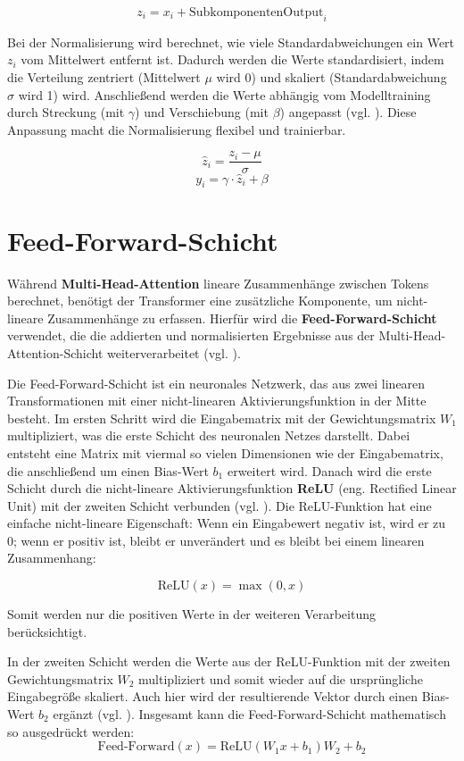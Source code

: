 \[
z_i = x_i + \text{SubkomponentenOutput}_i
\]

Bei der Normalisierung wird berechnet, wie viele Standardabweichungen ein Wert \( z_i \) vom Mittelwert entfernt ist. 
Dadurch werden die Werte standardisiert, indem die Verteilung zentriert (Mittelwert \( \mu \) wird 0) und skaliert (Standardabweichung \( \sigma \) wird 1) wird. 
Anschließend werden die Werte abhängig vom Modelltraining durch Streckung (mit \( \gamma \)) und Verschiebung (mit \( \beta \)) angepasst (vgl. \cite[K. 3]{layernorm}). 
Diese Anpassung macht die Normalisierung flexibel und trainierbar.

\[
\hat{z}_i = \frac{z_i - \mu}{\sigma}
\]
\[
y_i = \gamma \cdot \hat{z}_i + \beta
\]

\section{Feed-Forward-Schicht}

Während \textbf{Multi-Head-Attention} lineare Zusammenhänge zwischen Tokens berechnet, benötigt der Transformer eine zusätzliche Komponente, um nicht-lineare Zusammenhänge zu erfassen. 
Hierfür wird die \textbf{Feed-Forward-Schicht} verwendet, die die addierten und normalisierten Ergebnisse aus der Multi-Head-Attention-Schicht weiterverarbeitet (vgl. \cite[S. 5]{attention}).

Die Feed-Forward-Schicht ist ein neuronales Netzwerk, das aus zwei linearen Transformationen mit einer nicht-linearen Aktivierungsfunktion in der Mitte besteht.
Im ersten Schritt wird die Eingabematrix mit der Gewichtungsmatrix \( W_1 \) multipliziert, was die erste Schicht des neuronalen Netzes darstellt. Dabei entsteht eine Matrix mit viermal so vielen Dimensionen wie der Eingabematrix, die anschließend um einen Bias-Wert \( b_1 \) erweitert wird.
Danach wird die erste Schicht durch die nicht-lineare Aktivierungsfunktion \textbf{ReLU} (eng. Rectified Linear Unit) mit der zweiten Schicht verbunden (vgl. \cite[S. 212]{paass.2020}). 
Die ReLU-Funktion hat eine einfache nicht-lineare Eigenschaft: Wenn ein Eingabewert negativ ist, wird er zu 0; wenn er positiv ist, bleibt er unverändert und es bleibt bei einem linearen Zusammenhang:

\[
\text{ReLU}(x) = \max(0, x)
\]

Somit werden nur die positiven Werte in der weiteren Verarbeitung berücksichtigt.

In der zweiten Schicht werden die Werte aus der ReLU-Funktion mit der zweiten Gewichtungsmatrix \( W_2 \) multipliziert und somit wieder auf die ursprüngliche Eingabegröße skaliert. 
Auch hier wird der resultierende Vektor durch einen Bias-Wert \( b_2 \) ergänzt (vgl. \cite[S. 5]{attention}).
Insgesamt kann die Feed-Forward-Schicht mathematisch so ausgedrückt werden: 
\[
\text{Feed-Forward}(x) = \text{ReLU}(W_1 x + b_1) W_2 + b_2
\]

